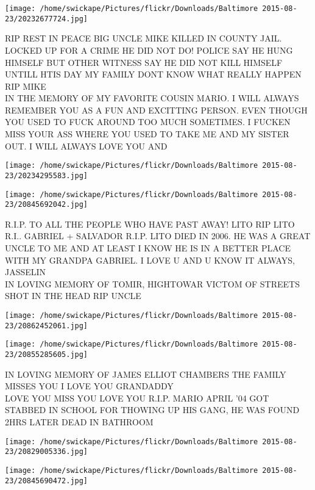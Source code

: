 \documentclass[10pt,letterpaper]{article}
\begin{document}
\vspace{0.25in}
\texttt{[image: /home/swickape/Pictures/flickr/Downloads/Baltimore 2015-08-23/20232677724.jpg]}

RIP REST IN PEACE BIG UNCLE MIKE KILLED IN COUNTY JAIL.  LOCKED UP FOR A CRIME HE DID NOT DO!  POLICE SAY HE HUNG HIMSELF BUT OTHER WITNESS SAY HE DID NOT KILL HIMSELF UNTILL HTIS DAY MY FAMILY DONT KNOW WHAT REALLY HAPPEN RIP MIKE\\
IN THE MEMORY OF MY FAVORITE COUSIN MARIO.  I WILL ALWAYS REMEMBER YOU AS A FUN AND EXCITTING PERSON.  EVEN THOUGH YOU USED TO FUCK AROUND TOO MUCH SOMETIMES.  I FUCKEN MISS YOUR ASS WHERE YOU USED TO TAKE ME AND MY SISTER OUT.  I WILL ALWAYS LOVE YOU AND
\pagebreak

\texttt{[image: /home/swickape/Pictures/flickr/Downloads/Baltimore 2015-08-23/20234295583.jpg]}

\vspace{0.25in}
\texttt{[image: /home/swickape/Pictures/flickr/Downloads/Baltimore 2015-08-23/20845692042.jpg]}

R.I.P. TO ALL THE PEOPLE WHO HAVE PAST AWAY!  LITO RIP LITO R.I.. GABRIEL + SALVADOR R.I.P. LITO DIED IN 2006.  HE WAS A GREAT UNCLE TO ME AND AT LEAST I KNOW HE IS IN A BETTER PLACE WITH MY GRANDPA GABRIEL.  I LOVE U AND U KNOW IT ALWAYS, JASSELIN\\
IN LOVING MEMORY OF TOMIR, HIGHTOWAR VICTOM OF STREETS SHOT IN THE HEAD RIP UNCLE
\pagebreak

\texttt{[image: /home/swickape/Pictures/flickr/Downloads/Baltimore 2015-08-23/20862452061.jpg]}

\vspace{0.25in}
\texttt{[image: /home/swickape/Pictures/flickr/Downloads/Baltimore 2015-08-23/20855285605.jpg]}

IN LOVING MEMORY OF JAMES ELLIOT CHAMBERS THE FAMILY MISSES YOU I LOVE YOU GRANDADDY\\
LOVE YOU MISS YOU LOVE YOU R.I.P. MARIO APRIL '04 GOT STABBED IN SCHOOL FOR THOWING UP HIS GANG, HE WAS FOUND 2HRS LATER DEAD IN BATHROOM
\pagebreak

\texttt{[image: /home/swickape/Pictures/flickr/Downloads/Baltimore 2015-08-23/20829005336.jpg]}

\vspace{0.25in}
\texttt{[image: /home/swickape/Pictures/flickr/Downloads/Baltimore 2015-08-23/20845690472.jpg]}
\end{document}
